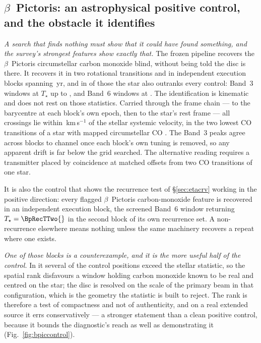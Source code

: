 \subsection{$\beta$~Pictoris: an astrophysical positive control, and the
obstacle it identifies} \label{sec:bpicval}

\emph{A search that finds nothing must show that it could have found
something, and the survey's strongest features show exactly that.} The
frozen pipeline recovers the $\beta$~Pictoris circumstellar carbon monoxide
blind, without being told the disc is there. It recovers it in two
rotational transitions and in \CsBpCoBlocks{} independent execution
blocks spanning \BpBaselineYr\,yr, and in \NStageOneBpicEb{} of those the
star also outranks every control: \BpicNFlagThree{} Band~3 windows at
$T_\star$ up to \BpicBThreeTsym, and \BpicNFlagSix{} Band~6 windows at
\BpicBSixTsym. The identification is kinematic and does not rest on those
statistics. Carried through the frame chain --- to the barycentre at each
block's own epoch, then to the star's rest frame --- all \BpicPanelNCo{}
crossings lie within \BpicDvCoHi\,km\,s$^{-1}$ of the stellar systemic
velocity, in the two lowest CO transitions of a star with mapped
circumstellar CO \citep{Dent2014,Matra2017}. The Band~3 peaks agree across blocks to
\BpRecThreeTuneChanMax{} channel once each block's own tuning is removed, so
any apparent drift is far below the grid searched. The alternative reading
requires a transmitter placed by coincidence at matched offsets from two CO
transitions of one star.

It is also the control that shows the recurrence test of
\S\ref{sec:etacrv} working in the positive direction: every flagged
$\beta$~Pictoris carbon-monoxide feature is recovered in an independent
execution block, the screened Band~6 window returning
$T_\star=\BpRecTTwo{}$ in the second block of its own recurrence set. A
non-recurrence elsewhere means nothing unless the same machinery recovers a
repeat where one exists.

\emph{One of those blocks is a counterexample, and it is the more useful half
of the control.} In it several of the \NCtrl{} control positions exceed the
stellar statistic, so the spatial rank disfavours a window holding carbon
monoxide known to be real and centred on the star; the disc is resolved on
the scale of the primary beam in that configuration, which is the geometry
the statistic is built to reject. The rank is therefore a test of
compactness and not of authenticity, and on a real extended source it errs
conservatively --- a stronger statement than a clean positive control, because
it bounds the diagnostic's reach as well as demonstrating it
(Fig.~\ref{fig:bpiccontrol}).


